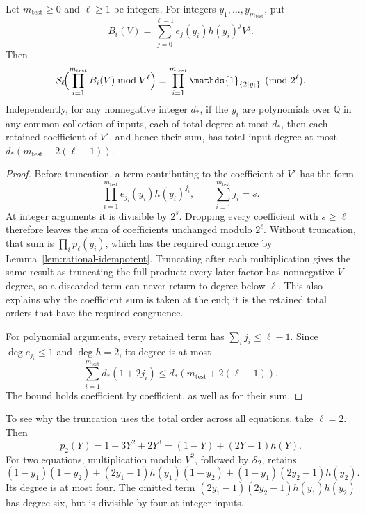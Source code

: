 \begin{lemma}\label{lem:total-order}
Let $m_{\mathrm{test}}\ge0$ and $\ell\ge1$ be integers. For integers
$y_1,\ldots,y_{m_{\mathrm{test}}}$, put
\[
 B_i(V)=\sum_{j=0}^{\ell-1}e_j(y_i)h(y_i)^jV^j.
\]
Then
\[
 \mathcal S_\ell\!\Bigl(\prod_{i=1}^{m_{\mathrm{test}}} B_i(V)\bmod V^\ell\Bigr)
 \equiv\prod_{i=1}^{m_{\mathrm{test}}}\mathds{1}_{\{2\mid y_i\}}\pmod{2^\ell}.
\]
Independently, for any nonnegative integer $d_*$, if the $y_i$ are
polynomials over $\mathbb Q$ in any common collection of inputs,
each of total degree at most $d_*$,
then each retained coefficient of $V^s$, and hence their sum, has
total input degree at most
$d_*(m_{\mathrm{test}}+2(\ell-1))$.
\end{lemma}
\begin{proof}
Before truncation, a term contributing to the coefficient of $V^s$
has the form
\[
 \prod_{i=1}^{m_{\mathrm{test}}} e_{j_i}(y_i)h(y_i)^{j_i},
 \qquad \sum_{i=1}^{m_{\mathrm{test}}} j_i=s.
\]
At integer arguments it is divisible by $2^s$. Dropping every
coefficient with $s\ge\ell$ therefore leaves the sum of coefficients
unchanged modulo $2^\ell$. Without truncation, that sum is
$\prod_i p_\ell(y_i)$, which has the required congruence by
Lemma~\ref{lem:rational-idempotent}.
Truncating after each multiplication gives the same result as
truncating the full product: every later factor has nonnegative
$V$-degree, so a discarded term can never return to degree below
$\ell$. This also explains why the coefficient sum is taken at
the end; it is the retained total orders that have the required
congruence.

For polynomial arguments, every retained term has
$\sum_i j_i\le\ell-1$. Since $\deg e_{j_i}\le1$ and $\deg h=2$,
its degree is at most
\[
 \sum_{i=1}^{m_{\mathrm{test}}} d_*(1+2j_i)
 \le d_*(m_{\mathrm{test}}+2(\ell-1)).
\]
The bound holds coefficient by coefficient, as well as for their sum.
\end{proof}

To see why the truncation uses the total order across all equations,
take $\ell=2$. Then
\[
 p_2(Y)=1-3Y^2+2Y^3=(1-Y)+(2Y-1)h(Y).
\]
For two equations, multiplication modulo $V^2$, followed by
$\mathcal S_2$, retains
\[
 (1-y_1)(1-y_2)
 +(2y_1-1)h(y_1)(1-y_2)
 +(1-y_1)(2y_2-1)h(y_2).
\]
Its degree is at most four. The omitted term
$(2y_1-1)(2y_2-1)h(y_1)h(y_2)$ has degree six, but is divisible
by four at integer inputs.


